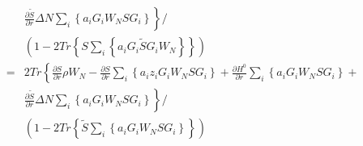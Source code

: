 \documentclass{article}
\begin{document}
\begin{eqnarray*}
 & & \left. \frac{\partial \tilde{S}}{\partial r} \Delta N \sum_i \left\{ a_i  G_i W_N S G_i \right\} \right\} / \\
 & & \left(1 -  2 Tr \left\{ S \sum_i \left\{ a_i G_i \tilde{S} G_i W_N \right\} \right\} \right) \\
& = & 2 Tr \left\{ \frac{\partial S}{\partial r} \rho W_N - \frac{\partial S}{\partial r} \sum_i \left\{ a_i z_i G_i W_N S G_i \right\} + \frac{\partial H^0}{\partial r} \sum_i \left\{ a_i G_i W_N S G_i \right\} + \right. \\
 & & \left. \frac{\partial \tilde{S}}{\partial r} \Delta N \sum_i \left\{ a_i  G_i W_N S G_i \right\} \right\} / \\
 & & \left(1 -  2 Tr \left\{ \tilde{S} \sum_i \left\{ a_i G_i W_N S G_i \right\} \right\} \right) \\
\end{eqnarray*}
\end{document}
